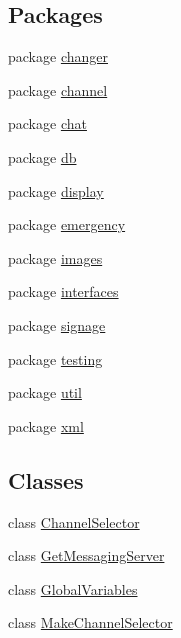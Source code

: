 \subsection*{Packages}
\begin{DoxyCompactItemize}
\item 
package \hyperlink{namespacegov_1_1fnal_1_1ppd_1_1dd_1_1changer}{changer}
\item 
package \hyperlink{namespacegov_1_1fnal_1_1ppd_1_1dd_1_1channel}{channel}
\item 
package \hyperlink{namespacegov_1_1fnal_1_1ppd_1_1dd_1_1chat}{chat}
\item 
package \hyperlink{namespacegov_1_1fnal_1_1ppd_1_1dd_1_1db}{db}
\item 
package \hyperlink{namespacegov_1_1fnal_1_1ppd_1_1dd_1_1display}{display}
\item 
package \hyperlink{namespacegov_1_1fnal_1_1ppd_1_1dd_1_1emergency}{emergency}
\item 
package \hyperlink{namespacegov_1_1fnal_1_1ppd_1_1dd_1_1images}{images}
\item 
package \hyperlink{namespacegov_1_1fnal_1_1ppd_1_1dd_1_1interfaces}{interfaces}
\item 
package \hyperlink{namespacegov_1_1fnal_1_1ppd_1_1dd_1_1signage}{signage}
\item 
package \hyperlink{namespacegov_1_1fnal_1_1ppd_1_1dd_1_1testing}{testing}
\item 
package \hyperlink{namespacegov_1_1fnal_1_1ppd_1_1dd_1_1util}{util}
\item 
package \hyperlink{namespacegov_1_1fnal_1_1ppd_1_1dd_1_1xml}{xml}
\end{DoxyCompactItemize}
\subsection*{Classes}
\begin{DoxyCompactItemize}
\item 
class \hyperlink{classgov_1_1fnal_1_1ppd_1_1dd_1_1ChannelSelector}{Channel\-Selector}
\item 
class \hyperlink{classgov_1_1fnal_1_1ppd_1_1dd_1_1GetMessagingServer}{Get\-Messaging\-Server}
\item 
class \hyperlink{classgov_1_1fnal_1_1ppd_1_1dd_1_1GlobalVariables}{Global\-Variables}
\item 
class \hyperlink{classgov_1_1fnal_1_1ppd_1_1dd_1_1MakeChannelSelector}{Make\-Channel\-Selector}
\end{DoxyCompactItemize}
